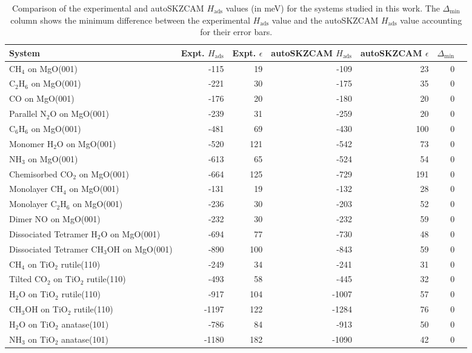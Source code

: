 \begin{table}
\caption{\label{tab:hads_comparison}Comparison of the experimental and autoSKZCAM $H_\text{ads}$ values (in meV) for the systems studied in this work. The $\Delta_\text{min}$ column shows the minimum difference between the experimental $H_\text{ads}$ value and the autoSKZCAM $H_\text{ads}$ value accounting for their error bars.}
\begin{adjustbox}{center,max width=0.9\textwidth}
\begin{tabular}{lrrrrrr}
\toprule
System & Expt. $H_\text{ads}$ & Expt. $\epsilon$ & autoSKZCAM $H_\text{ads}$ & autoSKZCAM $\epsilon$ & $\Delta_\text{min}$ \\ 
\midrule
CH$_4$ on MgO(001) & -115 & 19 & -109 & 23 & 0 \\
C$_2$H$_6$ on MgO(001) & -221 & 30 & -175 & 35 & 0 \\
CO on MgO(001) & -176 & 20 & -180 & 20 & 0 \\
Parallel N$_2$O on MgO(001) & -239 & 31 & -259 & 20 & 0 \\
C$_6$H$_6$ on MgO(001) & -481 & 69 & -430 & 100 & 0 \\
Monomer H$_2$O on MgO(001) & -520 & 121 & -542 & 73 & 0 \\
NH$_3$ on MgO(001) & -613 & 65 & -524 & 54 & 0 \\
Chemisorbed CO$_2$ on MgO(001) & -664 & 125 & -729 & 191 & 0 \\
Monolayer CH$_4$ on MgO(001) & -131 & 19 & -132 & 28 & 0 \\
Monolayer C$_2$H$_6$ on MgO(001) & -236 & 30 & -203 & 52 & 0 \\
Dimer NO on MgO(001) & -232 & 30 & -232 & 59 & 0 \\
Dissociated Tetramer H$_2$O on MgO(001) & -694 & 77 & -730 & 48 & 0 \\
Dissociated Tetramer CH$_3$OH on MgO(001) & -890 & 100 & -843 & 59 & 0 \\
CH$_4$ on TiO$_2$ rutile(110) & -249 & 34 & -241 & 31 & 0 \\
Tilted CO$_2$ on TiO$_2$ rutile(110) & -493 & 58 & -445 & 32 & 0 \\
H$_2$O on TiO$_2$ rutile(110) & -917 & 104 & -1007 & 57 & 0 \\
CH$_3$OH on TiO$_2$ rutile(110) & -1197 & 122 & -1284 & 76 & 0 \\
H$_2$O on TiO$_2$ anatase(101) & -786 & 84 & -913 & 50 & 0 \\
NH$_3$ on TiO$_2$ anatase(101) & -1180 & 182 & -1090 & 42 & 0 \\
\bottomrule
\end{tabular}
\end{adjustbox}
\end{table}